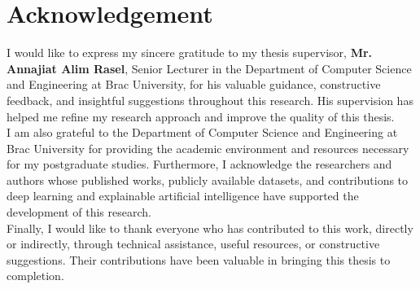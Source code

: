 \section*{Acknowledgement}

I would like to express my sincere gratitude to my thesis supervisor, \textbf{Mr. Annajiat Alim Rasel}, Senior Lecturer in the Department of Computer Science and Engineering at Brac University, for his valuable guidance, constructive feedback, and insightful suggestions throughout this research. His supervision has helped me refine my research approach and improve the quality of this thesis.\\

I am also grateful to the Department of Computer Science and Engineering at Brac University for providing the academic environment and resources necessary for my postgraduate studies. Furthermore, I acknowledge the researchers and authors whose published works, publicly available datasets, and contributions to deep learning and explainable artificial intelligence have supported the development of this research.\\

Finally, I would like to thank everyone who has contributed to this work, directly or indirectly, through technical assistance, useful resources, or constructive suggestions. Their contributions have been valuable in bringing this thesis to completion.
